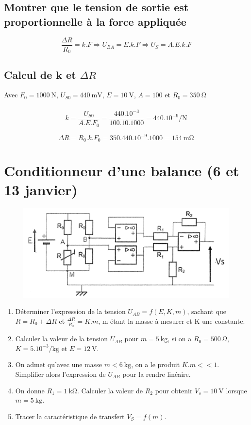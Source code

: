 \documentclass{article}
\begin{document}
\subsection{Montrer que le tension de sortie est proportionnelle à la force appliquée}

$$\frac{\Delta R}{R_0} = k.F \Rightarrow U_{BA} = E.k.F \Rightarrow U_S = A.E.k.F$$

\subsection{Calcul de k et $\Delta R$}
Avec $F_0 = \SI{1000}{\newton}$, $U_{S0} = \SI{440}{\milli\volt}$, $E = \SI{10}{\volt}$, $A = 100$ et $R_0 = \SI{350}{\ohm}$
\paragraph{}
$$ k = \frac{U_{S0}}{A.E.F_0} = \frac{440.10^{-3}}{100.10.1000} = 440.10^{-9} \si{\per\newton}$$

$$\Delta R = R_0.k.F_0 = 350.440.10^{-9}.1000 = \SI{154}{\milli\ohm}$$


\newpage
\section{Conditionneur d'une balance (6 et 13 janvier)}
\begin{figure}[H]
    \centering
    \includegraphics[width=0.8\linewidth]{./images/conditionneur-balance.png}
\end{figure}

\begin{enumerate}
    \item Déterminer l'expression de la tension $U_{AB} = f\left(E, K, m\right)$, sachant que $R = R_0 + \Delta R$ et $\frac{\Delta R}{R_0} = K.m$, m étant la masse à mesurer et K une constante.
    \item Calculer la valeur de la tension $U_{AB}$ pour $m = \SI{5}{\kilogram}$, si on a $R_0 = \SI{500}{\ohm}$, $K = 5.10^{-3} \si{\per\kilogram}$ et $E = \SI{12}{\volt}$.
    \item On admet qu'avec une masse $m < \SI{6}{\kilogram}$, on a le produit $K.m << 1$. Simplifier alors l'expression de $U_{AB}$ pour la rendre linéaire.
    \item On donne $R_1 = \SI{1}{\kilo\ohm}$. Calculer la valeur de $R_2$ pour obtenir $V_s = \SI{10}{\volt}$ lorsque $m = \SI{5}{\kilogram}$.
    \item Tracer la caractéristique de transfert $V_S = f(m)$.
\end{enumerate}
\end{document}
